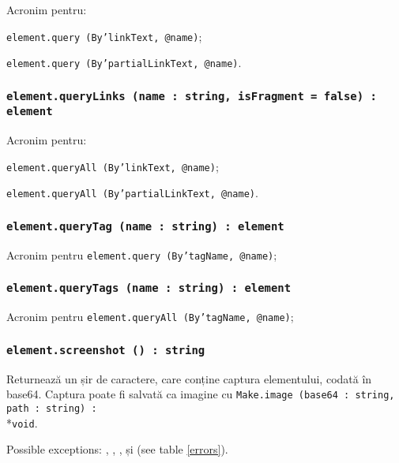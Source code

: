 Acronim pentru:
\begin{icItems}
	\item \texttt{element.query (By'linkText, @name)};
	\item \texttt{element.query (By'partialLinkText, @name)}.
\end{icItems}

\subsubsection{\texttt{element.queryLinks (name : string, isFragment = false) : element}}

Acronim pentru:
\begin{icItems}
	\item \texttt{element.queryAll (By'linkText, @name)};
	\item \texttt{element.queryAll (By'partialLinkText, @name)}.
\end{icItems}

\subsubsection{\texttt{element.queryTag (name : string) : element}}

Acronim pentru \texttt{element.query (By'tagName, @name)};

\subsubsection{\texttt{element.queryTags (name : string) : element}}

Acronim pentru \texttt{element.queryAll (By'tagName, @name)};

\subsubsection{\texttt{element.screenshot () : string}}

Returnează un șir de caractere, care conține captura elementului, codată în base64. Captura poate fi salvată ca imagine cu \texttt{Make.image (base64 : string, path : string) :}\\*\texttt{void}.

Possible exceptions: , , ,  și  (see table \ref{errors}).

